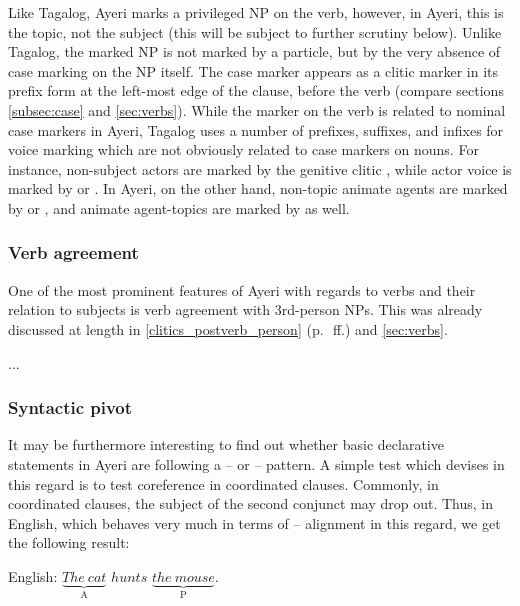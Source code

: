 \xe

Like Tagalog, Ayeri marks a privileged NP on the verb, however, in Ayeri, this
is the topic, not the subject (this will be subject to further scrutiny below).
Unlike Tagalog, the marked NP is not marked by a particle, but by the very
absence of case marking on the NP itself. The case marker appears as a clitic
marker in its prefix form at the left-most edge of the clause, before the verb
(compare sections \ref{subsec:case} and \ref{sec:verbs}). While the marker on
the verb is related to nominal case markers in Ayeri, Tagalog uses a number of
prefixes, suffixes, and infixes for voice marking which are not obviously
related to case markers on nouns. For instance, non-subject actors are marked
by the genitive clitic , while actor voice is marked by  or
 \citep[74, 78]{schachterotanes1972}. In Ayeri, on the other hand,
non-topic animate agents are marked by  or ,
and animate agent-topics are marked by  as well.

\subsubsection{Verb agreement}
\label{subsubsec:verbagr}

One of the most prominent features of Ayeri with regards to verbs and their
relation to subjects is verb agreement with 3rd-person NPs. This was already
discussed at length in \autoref{clitics_postverb_person} 
(p.~\pageref{clitics_postverb_person}\,ff.) and \autoref{sec:verbs}.

...

\subsubsection{Syntactic pivot}
\label{subsubsec:pivot}

It may be furthermore interesting to find out whether basic declarative
statements in Ayeri are following a \Nom{}--\Acc{} or \Abs{}--\Erg{} pattern. A
simple test which \citet[111--114]{comrie1989} devises in this regard is to
test coreference in coordinated clauses. Commonly, in coordinated clauses, the
subject of the second conjunct may drop out. Thus, in English, which behaves
very much in terms of \Nom{}--\Acc{} alignment in this regard, we get the
following result:

\pex[belowexskip=1.75em]\label{ex:engpivot}%
	English:
	\a\label{ex:engpivot_1}
		$\underbrace{The\ cat}_{\text{A}}$ 
		$hunts$ $\underbrace{the\ mouse}_{\text{P}}$.
	
